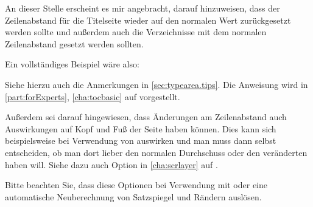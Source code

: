 An dieser Stelle erscheint es mir angebracht, darauf
hinzuweisen, dass der Zeilenabstand für die Titelseite wieder auf den normalen
Wert zurückgesetzt werden sollte und außerdem auch die Verzeichnisse mit dem
normalen Zeilenabstand gesetzt werden sollten.
\begin{Example}
  Ein vollständiges Beispiel wäre also:
  Siehe hierzu auch die Anmerkungen in \autoref{sec:typearea.tips}. Die
  Anweisung  wird in
  \autoref{part:forExperts}, \autoref{cha:tocbasic} auf
   vorgestellt.
\end{Example}
Außerdem sei darauf hingewiesen, dass Änderungen am Zeilenabstand auch
Auswirkungen auf Kopf und Fuß der Seite haben können. Dies kann sich
beispielsweise bei Verwendung von  auswirken und man
muss dann selbst entscheiden, ob man dort lieber den normalen Durchschuss oder
den veränderten haben will. Siehe dazu auch Option
 in \autoref{cha:scrlayer}%
%
 auf
.

Bitte beachten Sie\iffalse %
\ unbedingt\fi{}, dass diese Optionen
\iffalse %
auch zur \else bei \fi Verwendung mit 
oder  \iffalse %
nach dem Laden des Pakets vorgesehen sind und dann \fi eine
automatische Neuberechnung von
Satzspiegel und Rändern auslösen.%
%
\EndIndexGroup
\EndIndexGroup


